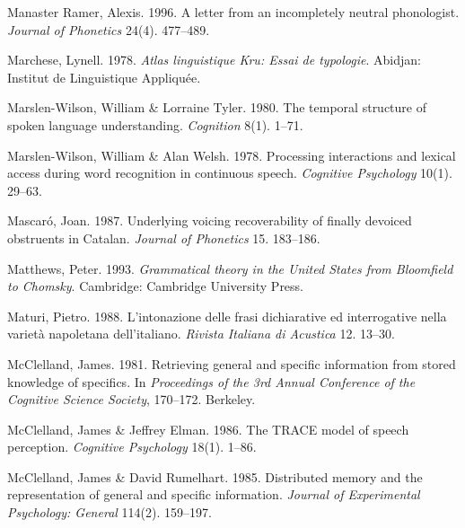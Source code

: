 \documentclass[ number=1
,series=labphon
,output=long
,url=http://langsci-press.org/catalog/book/16
,isbn=978-3-944675-01-5
]{LSP/langsci}
\begin{document}
\begin{thebibliography}{284}
{Manaster Ramer}, Alexis. 1996.
\newblock A letter from an incompletely neutral phonologist.
\newblock \emph{Journal of Phonetics} 24(4). 477--489.

Marchese, Lynell. 1978.
\newblock \emph{Atlas linguistique {K}ru: {E}ssai de typologie}.
\newblock Abidjan: Institut de Linguistique Appliqu\'{e}e.

Marslen-Wilson, William \& Lorraine Tyler. 1980.
\newblock The temporal structure of spoken language understanding.
\newblock \emph{Cognition} 8(1). 1--71.

Marslen-Wilson, William \& Alan Welsh. 1978.
\newblock Processing interactions and lexical access during word recognition in
  continuous speech.
\newblock \emph{Cognitive Psychology} 10(1). 29--63.

Mascar{\'o}, Joan. 1987.
\newblock Underlying voicing recoverability of finally devoiced obstruents in
  {C}atalan.
\newblock \emph{Journal of Phonetics} 15. 183--186.

Matthews, Peter. 1993.
\newblock \emph{Grammatical theory in the {U}nited {S}tates from {B}loomfield
  to {C}homsky}.
\newblock Cambridge: Cambridge University Press.

Maturi, Pietro. 1988.
\newblock L'intonazione delle frasi dichiarative ed interrogative nella
  variet\`{a} napoletana dell'italiano.
\newblock \emph{Rivista Italiana di Acustica} 12. 13--30.

McClelland, James. 1981.
\newblock Retrieving general and specific information from stored knowledge of
  specifics.
\newblock In \emph{Proceedings of the 3rd {Annual Conference of the Cognitive
  Science Society}}, 170--172. Berkeley.

McClelland, James \& Jeffrey Elman. 1986.
\newblock The {TRACE} model of speech perception.
\newblock \emph{Cognitive Psychology} 18(1). 1--86.

McClelland, James \& David Rumelhart. 1985.
\newblock Distributed memory and the representation of general and specific
  information.
\newblock \emph{Journal of Experimental Psychology: General} 114(2). 159--197.


\end{thebibliography}
\end{document}
